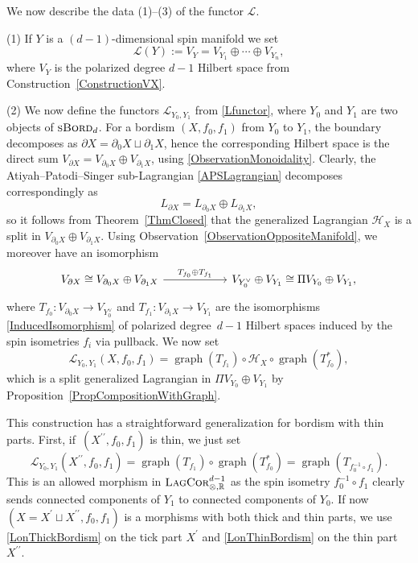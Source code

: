 \documentclass[10pt,a4paper]{amsart}
\numberwithin{equation}{section}
\DeclareMathOperator{\graph}{\mathrm{graph}}
\newcommand{\LagCor}{\textsc{LagCor}}
\newcommand{\R}{\mathbb{R}}
\newcommand{\sBord}{\textsc{sBord}}
\begin{document}
We now describe the data (1)--(3) of the functor $\mathcal{L}$.

(1) If $Y$ is a $(d-1)$-dimensional spin manifold we set
\begin{equation*}
\mathcal{L}(Y) := V_Y = V_{Y_1} \oplus \cdots \oplus V_{Y_n},
\end{equation*}
where $V_Y$ is the polarized degree $d-1$ Hilbert space from Construction~\ref{ConstructionVX}.

(2)
We now define the functors $\mathcal{L}_{Y_0, Y_1}$ from \eqref{Lfunctor}, where $Y_0$ and $Y_1$ are two objects of $\sBord_d$.
For a bordism $(X, f_0, f_1)$ from $Y_0$ to $Y_1$, the boundary decomposes as $\partial X = \partial_0 X \sqcup \partial_1 X$, hence the corresponding Hilbert space is the direct sum $V_{\partial X} = V_{\partial_0 X} \oplus V_{\partial_1 X}$, using \eqref{ObservationMonoidality}.
Clearly, the Atiyah--Patodi--Singer sub-Lagrangian \eqref{APSLagrangian} decomposes correspondingly as
\begin{equation*}
 L_{\partial X} = L_{\partial_0 X} \oplus L_{\partial_1 X},
\end{equation*}
so it follows from Theorem~\ref{ThmClosed} that the generalized Lagrangian $\mathcal{H}_X$ is a split in $V_{\partial_0 X} \oplus V_{\partial_1 X}$.
Using Observation~\ref{ObservationOppositeManifold}, we moreover have an isomorphism
\begin{equation*}
\begin{tikzcd}[column sep=2cm]
V_{\partial X} \cong V_{\partial_0 X} \oplus V_{\partial_1 X}
\ar[r, "T_{f_0} \oplus T_{f_1}"] &
V_{Y_0^\vee} \oplus V_{Y_1} \cong \Pi V_{Y_0} \oplus V_{Y_1},
\end{tikzcd}
\end{equation*}
where $T_{f_0}\colon V_{\partial_0 X} \to V_{Y_0^\vee}$ and $T_{f_1}\colon V_{\partial_1 X} \to V_{Y_1}$ are the isomorphisms \eqref{InducedIsomorphism} of polarized degree~${d-1}$ Hilbert spaces induced by the spin isometries $f_i$ via pullback.
We now set
\begin{equation}
\label{LonThickBordism}
 \mathcal{L}_{Y_0, Y_1}(X, f_0, f_1) = \graph(T_{f_1}) \circ \mathcal{H}_X \circ \graph(T_{f_0}^*),
\end{equation}
which is a split generalized Lagrangian in $\Pi V_{Y_0} \oplus V_{Y_1}$ by Proposition~\ref{PropCompositionWithGraph}.

This construction has a straightforward generalization for bordism with thin parts.
First, if~$(X^{\prime\prime}, f_0, f_1)$ is thin, we just set
\begin{equation}
\label{LonThinBordism}
 \mathcal{L}_{Y_0, Y_1}(X^{\prime\prime}, f_0, f_1) = \graph(T_{f_1}) \circ \graph(T_{f_0}^*) = \graph(T_{f_0^{-1} \circ f_1}).
\end{equation}
This is an allowed morphism in $\LagCor_{\otimes, \R}^{d-1}$ as the spin isometry $f_0^{-1} \circ f_1$ clearly sends connected components of $Y_1$ to connected components of $Y_0$.
If now $(X = X^\prime \sqcup X^{\prime\prime}, f_0, f_1)$ is a morphisms with both thick and thin parts, we use \eqref{LonThickBordism} on the tick part $X^\prime$ and \eqref{LonThinBordism} on the thin part $X^{\prime\prime}$.
\end{document}
